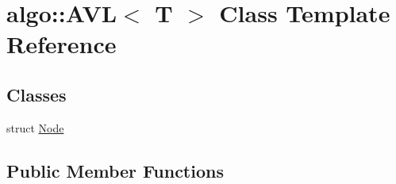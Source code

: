 \hypertarget{classalgo_1_1_a_v_l}{}\section{algo\+:\+:A\+VL$<$ T $>$ Class Template Reference}
\label{classalgo_1_1_a_v_l}
\subsection*{Classes}
\begin{DoxyCompactItemize}
\item 
struct \hyperlink{structalgo_1_1_a_v_l_1_1_node}{Node}
\end{DoxyCompactItemize}
\subsection*{Public Member Functions}
